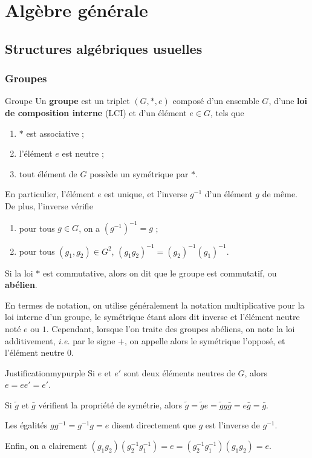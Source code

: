 \chapter{Algèbre générale}
\chaptertoc

\section{Structures algébriques usuelles}

\subsection{Groupes}

    \begin{defitheo}{Groupe}{}
        Un \textbf{groupe} est un triplet $(G,*,e)$ composé d’un ensemble $G$, d’une \textbf{loi de composition interne} (LCI) et d’un élément $e \in G$, tels que 
        \begin{enumerate}[label=$(h_{\alph*})$]
            \item $*$ est associative ;
            \item l’élément $e$ est neutre ;
            \item tout élément de $G$ possède un symétrique par $*$.
        \end{enumerate}
        En particulier, l’élément $e$ est unique, et l’inverse $g^{-1}$ d’un élément $g$ de même. De plus, l’inverse vérifie
        \begin{enumerate}[label = \arabic*.]
            \item pour tous $g \in G$, on a $(g^{-1})^{-1} = g$ ;
            \item pour tous $(g_1,g_2) \in G^2$, $(g_1 g_2)^{-1} = (g_2)^{-1} (g_1)^{-1}$.
        \end{enumerate}
        Si la loi $*$ est commutative, alors on dit que le groupe est commutatif, ou \textbf{abélien}.
    \end{defitheo}

    En termes de notation, on utilise généralement la notation multiplicative pour la loi interne d’un groupe, le symétrique étant alors dit inverse et l’élément neutre noté $e$ ou $1$. Cependant, lorsque l’on traite des groupes abéliens, on note la loi additivement, \textit{i.e.} par le signe $+$, on appelle alors le symétrique l’opposé, et l’élément neutre $0$.

    \begin{demo}{Justification}{mypurple}
        Si $e$ et $e'$ sont deux éléments neutres de $G$, alors $e = e e' = e'$.

        Si $\tilde{g}$ et $\bar{g}$ vérifient la propriété de symétrie, alors $\tilde{g} = \tilde{g} e = \tilde{g} g \bar{g} = e \bar{g} = \bar{g}$.

        Les égalités $gg^{-1} = g^{-1}g=e$ disent directement que $g$ est l’inverse de $g^{-1}$.

        Enfin, on a clairement $(g_1 g_2)(g_2^{-1} g_1^{-1}) = e = (g_2^{-1} g_1^{-1})(g_1 g_2) = e$.
    \end{demo}

